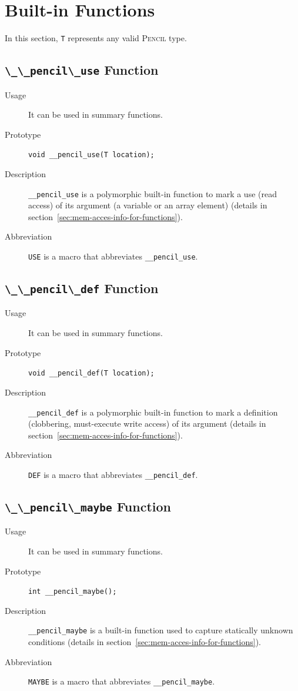 \documentclass{carp}
\newcommand\pencil{\textsc{Pencil}\xspace}
\begin{document}
\section{Built-in Functions}

In this section, \lstinline!T! represents any valid \pencil type.

\subsection{\lstinline!\_\_pencil\_use! Function}
\begin{description}
\item [Usage] It can be used in summary functions.
\item [Prototype] \lstinline!void __pencil_use(T location);!
\item [Description] \lstinline!__pencil_use! is
  a polymorphic built-in function to mark a use (read access) of
  its argument (a variable or an array element)
  (details in section~\ref{sec:mem-acces-info-for-functions}).
\item [Abbreviation] \lstinline!USE! is a macro that abbreviates
  \lstinline!__pencil_use!.
\end{description}

\subsection{\lstinline!\_\_pencil\_def! Function}
\begin{description}
\item [Usage] It can be used in summary functions.
\item [Prototype] \lstinline!void __pencil_def(T location);!
\item [Description] \lstinline!__pencil_def! is a polymorphic
  built-in function to mark a definition (clobbering, must-execute write
  access) of its argument (details in
  section~\ref{sec:mem-acces-info-for-functions}).
\item [Abbreviation] \lstinline!DEF! is a macro that abbreviates
  \lstinline!__pencil_def!.
\end{description}

\subsection{\lstinline!\_\_pencil\_maybe! Function}
\begin{description}
\item [Usage] It can be used in summary functions.
\item [Prototype] \lstinline!int __pencil_maybe();!
\item [Description] \lstinline!__pencil_maybe! is
  a built-in function used to capture statically unknown conditions
  (details in section~\ref{sec:mem-acces-info-for-functions}).
\item [Abbreviation] \lstinline!MAYBE! is a macro that abbreviates
  \lstinline!__pencil_maybe!.
\end{description}
\end{document}
